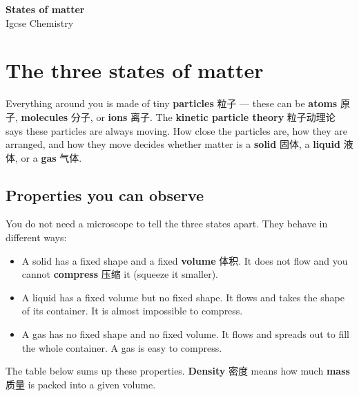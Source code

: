 \documentclass[11pt]{article}
\begin{document}
\begin{center}
  {\LARGE\bfseries States of matter}\\[0.35em]
  {\large Igcse Chemistry}
\end{center}
\vspace{0.6em}

\section*{The three states of matter}

Everything around you is made of tiny \textbf{particles} 粒子 — these can be \textbf{atoms} 原子, \textbf{molecules} 分子, or \textbf{ions} 离子. The \textbf{kinetic particle theory} 粒子动理论 says these particles are always moving. How close the particles are, how they are arranged, and how they move decides whether matter is a \textbf{solid} 固体, a \textbf{liquid} 液体, or a \textbf{gas} 气体.

\subsection*{Properties you can observe}

You do not need a microscope to tell the three states apart. They behave in different ways:

\begin{itemize}
\item A solid has a fixed shape and a fixed \textbf{volume} 体积. It does not flow and you cannot \textbf{compress} 压缩 it (squeeze it smaller).

\item A liquid has a fixed volume but no fixed shape. It flows and takes the shape of its container. It is almost impossible to compress.

\item A gas has no fixed shape and no fixed volume. It flows and spreads out to fill the whole container. A gas is easy to compress.

\end{itemize}

The table below sums up these properties. \textbf{Density} 密度 means how much \textbf{mass} 质量 is packed into a given volume.

\begin{center}
\end{center}
\end{document}
